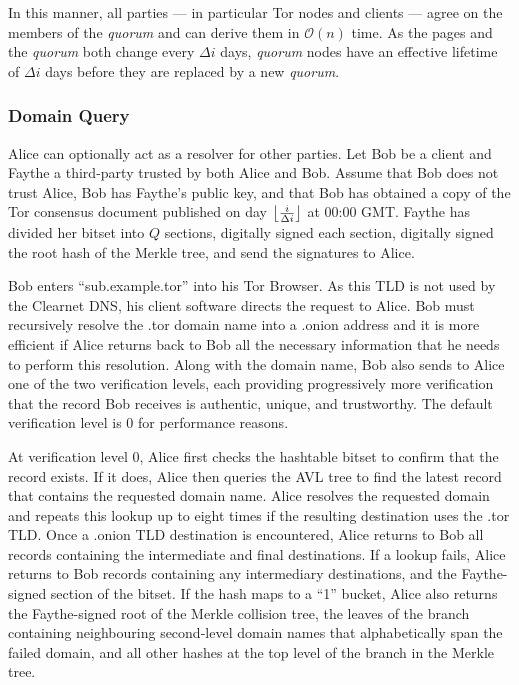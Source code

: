 In this manner, all parties --- in particular Tor nodes and clients --- agree on the members of the \emph{quorum} and can derive them in $ \mathcal{O}(n) $ time. As the pages and the \emph{quorum} both change every $ \Delta i $ days, \emph{quorum} nodes have an effective lifetime of $ \Delta i $ days before they are replaced by a new \emph{quorum}.

\subsubsection{Domain Query}


Alice can optionally act as a resolver for other parties. Let Bob be a client and Faythe a third-party trusted by both Alice and Bob. Assume that Bob does not trust Alice, Bob has Faythe's public key, and that Bob has obtained a copy of the Tor consensus document published on day $ \floor[\big]{\frac{i}{\Delta i}} $ at 00:00 GMT. Faythe has divided her bitset into $ Q $ sections, digitally signed each section, digitally signed the root hash of the Merkle tree, and send the signatures to Alice.

Bob enters ``sub.example.tor'' into his Tor Browser. As this TLD is not used by the Clearnet DNS, his client software directs the request to Alice. Bob must recursively resolve the .tor domain name into a .onion address and it is more efficient if Alice returns back to Bob all the necessary information that he needs to perform this resolution. Along with the domain name, Bob also sends to Alice one of the two verification levels, each providing progressively more verification that the record Bob receives is authentic, unique, and trustworthy. The default verification level is 0 for performance reasons.

At verification level 0, Alice first checks the hashtable bitset to confirm that the record exists. If it does, Alice then queries the AVL tree to find the latest record that contains the requested domain name. Alice resolves the requested domain and repeats this lookup up to eight times if the resulting destination uses the .tor TLD. Once a .onion TLD destination is encountered, Alice returns to Bob all records containing the intermediate and final destinations. If a lookup fails, Alice returns to Bob records containing any intermediary destinations, and the Faythe-signed section of the bitset. If the hash maps to a ``1'' bucket, Alice also returns the Faythe-signed root of the Merkle collision tree, the leaves of the branch containing neighbouring second-level domain names that alphabetically span the failed domain, and all other hashes at the top level of the branch in the Merkle tree.

